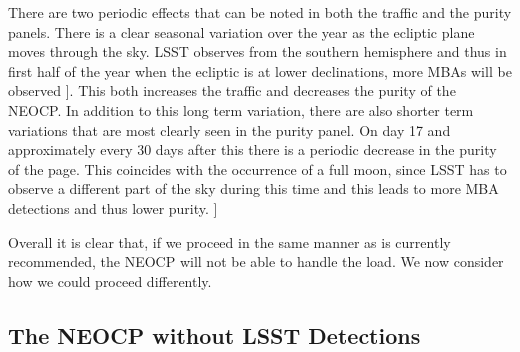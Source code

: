 \documentclass[twocolumn]{aastex631}
\newcommand{\todo}[1]{{\color{red}{[TODO: #1}]}}
\begin{document}
There are two periodic effects that can be noted in both the traffic and the purity panels. There is a clear seasonal variation over the year as the ecliptic plane moves through the sky. LSST observes from the southern hemisphere and thus in first half of the year when the ecliptic is at lower declinations, more MBAs will be observed \todo{@Mario I think this I have this backwards, ecliptic is high in July right? ...but the traffic definitely peaks in the first half??}. This both increases the traffic and decreases the purity of the NEOCP. In addition to this long term variation, there are also shorter term variations that are most clearly seen in the purity panel. On day 17 and approximately every 30 days after this there is a periodic decrease in the purity of the page. This coincides with the occurrence of a full moon, since LSST has to observe a different part of the sky during this time and this leads to more MBA detections and thus lower purity. \todo{I left this a bit handwavy, need to check with Mario}

Overall it is clear that, if we proceed in the same manner as is currently recommended, the NEOCP will not be able to handle the load. We now consider how we could proceed differently.

\subsection{The NEOCP without LSST Detections}\label{sec:no_LSST_detections}
\end{document}

